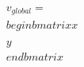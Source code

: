 \documentclass[preview]{standalone}
\begin{document}
\begin{align*}
v_{global} = \\begin{bmatrix} x \\\\ y \\end{bmatrix}
\end{align*}
\end{document}
